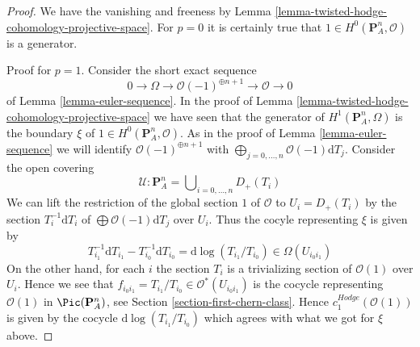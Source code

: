 \begin{proof}
We have the vanishing and freeness by
Lemma \ref{lemma-twisted-hodge-cohomology-projective-space}.
For $p = 0$ it is certainly true that
$1 \in H^0(\mathbf{P}^n_A, \mathcal{O})$ is a generator.

\medskip\noindent
Proof for $p = 1$. Consider the short exact sequence
$$
0 \to \Omega \to \mathcal{O}(-1)^{\oplus n + 1} \to \mathcal{O} \to 0
$$
of Lemma \ref{lemma-euler-sequence}. In the proof of
Lemma \ref{lemma-twisted-hodge-cohomology-projective-space}
we have seen that the generator of $H^1(\mathbf{P}^n_A, \Omega)$
is the boundary $\xi$ of $1 \in H^0(\mathbf{P}^n_A, \mathcal{O})$.
As in the proof of Lemma \ref{lemma-euler-sequence} we will identify
$\mathcal{O}(-1)^{\oplus n + 1}$ with
$\bigoplus_{j = 0, \ldots, n} \mathcal{O}(-1)\text{d}T_j$.
Consider the open covering
$$
\mathcal{U} : 
\mathbf{P}^n_A =
\bigcup\nolimits_{i = 0, \ldots, n} D_{+}(T_i)
$$
We can lift the restriction of the global section $1$ of $\mathcal{O}$
to $U_i = D_+(T_i)$ by the section $T_i^{-1} \text{d}T_i$ of
$\bigoplus \mathcal{O}(-1)\text{d}T_j$ over $U_i$. Thus the cocyle
representing $\xi$ is given by
$$
T_{i_1}^{-1} \text{d}T_{i_1} - T_{i_0}^{-1} \text{d}T_{i_0} =
\text{d}\log(T_{i_1}/T_{i_0}) \in \Omega(U_{i_0i_1})
$$
On the other hand, for each $i$ the section $T_i$ is a trivializing
section of $\mathcal{O}(1)$ over $U_i$. Hence we see that
$f_{i_0i_1} = T_{i_1}/T_{i_0} \in \mathcal{O}^*(U_{i_0i_1})$
is the cocycle representing $\mathcal{O}(1)$ in $\Pic(\mathbf{P}^n_A)$,
see Section \ref{section-first-chern-class}.
Hence $c_1^{Hodge}(\mathcal{O}(1))$
is given by the cocycle $\text{d}\log(T_{i_1}/T_{i_0})$
which agrees with what we got for $\xi$ above.


\end{proof}
